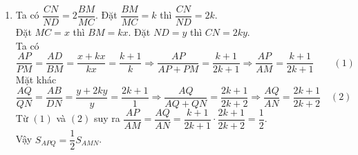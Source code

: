 \begin{bt}
{\begin{enumerate}
\begin{center}
			\end{center}
			\item Ta có $\dfrac{CN}{ND}=2\dfrac{BM}{MC}$. Đặt $\dfrac{BM}{MC}=k$ thì $\dfrac{CN}{ND}=2k$.\\
			Đặt $MC=x$ thì $BM=kx$. Đặt $ND=y$ thì $CN=2ky$.\\
			Ta có $\dfrac{AP}{PM}=\dfrac{AD}{BM}=\dfrac{x+kx}{kx}=\dfrac{k+1}{k}\Rightarrow \dfrac{AP}{AP+PM}=\dfrac{k+1}{2k+1}\Rightarrow \dfrac{AP}{AM}=\dfrac{k+1}{2k+1}\quad\quad (1)$\\
			Mặt khác $\dfrac{AQ}{QN}=\dfrac{AB}{DN}=\dfrac{y+2ky}{y}=\dfrac{2k+1}{1}\Rightarrow \dfrac{AQ}{AQ+QN}=\dfrac{2k+1}{2k+2}\Rightarrow \dfrac{AQ}{AN}=\dfrac{2k+1}{2k+2}\quad (2)$\\
			Từ $(1)$ và $(2)$ suy ra $\dfrac{AP}{AM}=\dfrac{AQ}{AN}=\dfrac{k+1}{2k+1}\cdot\dfrac{2k+1}{2k+2}=\dfrac{1}{2}$.\\
			Vậy $S_{APQ}=\dfrac{1}{2}S_{AMN}$.
		\end{enumerate}
	}
\end{bt}


